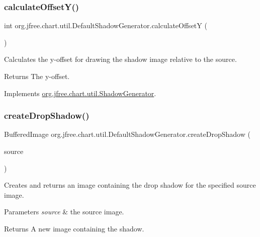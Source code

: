 \subsubsection{\texorpdfstring{calculate\+Offset\+Y()}{calculateOffsetY()}}
{\footnotesize\ttfamily int org.\+jfree.\+chart.\+util.\+Default\+Shadow\+Generator.\+calculate\+OffsetY (\begin{DoxyParamCaption}{ }\end{DoxyParamCaption})}

Calculates the y-\/offset for drawing the shadow image relative to the source.

\begin{DoxyReturn}{Returns}
The y-\/offset. 
\end{DoxyReturn}


Implements \mbox{\hyperlink{interfaceorg_1_1jfree_1_1chart_1_1util_1_1_shadow_generator_a86796160b6e9262408d7848d8ddaff0f}{org.\+jfree.\+chart.\+util.\+Shadow\+Generator}}.

\mbox{\label{classorg_1_1jfree_1_1chart_1_1util_1_1_default_shadow_generator_a5ecdea4578e1625dc9b059108c6c82b6}} 
\subsubsection{\texorpdfstring{create\+Drop\+Shadow()}{createDropShadow()}}
{\footnotesize\ttfamily Buffered\+Image org.\+jfree.\+chart.\+util.\+Default\+Shadow\+Generator.\+create\+Drop\+Shadow (\begin{DoxyParamCaption}\item[{Buffered\+Image}]{source }\end{DoxyParamCaption})}

Creates and returns an image containing the drop shadow for the specified source image.


\begin{DoxyParams}{Parameters}
{\em source} & the source image.\\
\hline
\end{DoxyParams}
\begin{DoxyReturn}{Returns}
A new image containing the shadow. 
\end{DoxyReturn}



